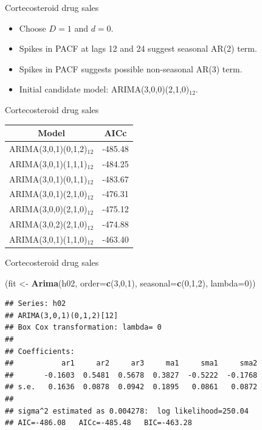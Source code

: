 \documentclass[14pt,ignorenonframetext,]{beamer}
\newenvironment{Shaded}{\begin{snugshade}}{\end{snugshade}}
\newcommand{\KeywordTok}[1]{\textcolor[rgb]{0.13,0.29,0.53}{\textbf{#1}}}
\newcommand{\DataTypeTok}[1]{\textcolor[rgb]{0.13,0.29,0.53}{#1}}
\newcommand{\DecValTok}[1]{\textcolor[rgb]{0.00,0.00,0.81}{#1}}
\newcommand{\StringTok}[1]{\textcolor[rgb]{0.31,0.60,0.02}{#1}}
\newcommand{\NormalTok}[1]{#1}
\providecommand{\tightlist}{%
  \setlength{\itemsep}{0pt}\setlength{\parskip}{0pt}}
\begin{document}
\begin{frame}{Cortecosteroid drug sales}

\begin{itemize}
\tightlist
\item
  Choose \(D=1\) and \(d=0\).
\item
  Spikes in PACF at lags 12 and 24 suggest seasonal AR(2) term.
\item
  Spikes in PACF suggests possible non-seasonal AR(3) term.
\item
  Initial candidate model: ARIMA(3,0,0)(2,1,0)\(_{12}\).
\end{itemize}

\end{frame}

\begin{frame}{Cortecosteroid drug sales}

\begin{longtable}[]{@{}cc@{}}
\toprule
Model & AICc\tabularnewline
\midrule
\endhead
ARIMA(3,0,1)(0,1,2)\(_{12}\) & -485.48\tabularnewline
ARIMA(3,0,1)(1,1,1)\(_{12}\) & -484.25\tabularnewline
ARIMA(3,0,1)(0,1,1)\(_{12}\) & -483.67\tabularnewline
ARIMA(3,0,1)(2,1,0)\(_{12}\) & -476.31\tabularnewline
ARIMA(3,0,0)(2,1,0)\(_{12}\) & -475.12\tabularnewline
ARIMA(3,0,2)(2,1,0)\(_{12}\) & -474.88\tabularnewline
ARIMA(3,0,1)(1,1,0)\(_{12}\) & -463.40\tabularnewline
\bottomrule
\end{longtable}

\end{frame}

\begin{frame}[fragile]{Cortecosteroid drug sales}

\fontsize{11}{12}\sf

\begin{Shaded}
\begin{Highlighting}[]
\NormalTok{(fit <-}\StringTok{ }\KeywordTok{Arima}\NormalTok{(h02, }\DataTypeTok{order=}\KeywordTok{c}\NormalTok{(}\DecValTok{3}\NormalTok{,}\DecValTok{0}\NormalTok{,}\DecValTok{1}\NormalTok{), }\DataTypeTok{seasonal=}\KeywordTok{c}\NormalTok{(}\DecValTok{0}\NormalTok{,}\DecValTok{1}\NormalTok{,}\DecValTok{2}\NormalTok{),}
   \DataTypeTok{lambda=}\DecValTok{0}\NormalTok{))}
\end{Highlighting}
\end{Shaded}

\begin{verbatim}
## Series: h02 
## ARIMA(3,0,1)(0,1,2)[12] 
## Box Cox transformation: lambda= 0 
## 
## Coefficients:
##           ar1     ar2     ar3     ma1     sma1     sma2
##       -0.1603  0.5481  0.5678  0.3827  -0.5222  -0.1768
## s.e.   0.1636  0.0878  0.0942  0.1895   0.0861   0.0872
## 
## sigma^2 estimated as 0.004278:  log likelihood=250.04
## AIC=-486.08   AICc=-485.48   BIC=-463.28
\end{verbatim}

\end{frame}
\end{document}

